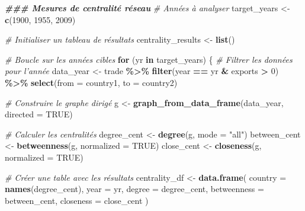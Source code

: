 \documentclass[
]{article}
\newenvironment{Shaded}{\begin{snugshade}}{\end{snugshade}}
\newcommand{\AttributeTok}[1]{\textcolor[rgb]{0.13,0.29,0.53}{#1}}
\newcommand{\CommentTok}[1]{\textcolor[rgb]{0.56,0.35,0.01}{\textit{#1}}}
\newcommand{\ConstantTok}[1]{\textcolor[rgb]{0.56,0.35,0.01}{#1}}
\newcommand{\ControlFlowTok}[1]{\textcolor[rgb]{0.13,0.29,0.53}{\textbf{#1}}}
\newcommand{\DecValTok}[1]{\textcolor[rgb]{0.00,0.00,0.81}{#1}}
\newcommand{\DocumentationTok}[1]{\textcolor[rgb]{0.56,0.35,0.01}{\textbf{\textit{#1}}}}
\newcommand{\FunctionTok}[1]{\textcolor[rgb]{0.13,0.29,0.53}{\textbf{#1}}}
\newcommand{\NormalTok}[1]{#1}
\newcommand{\OtherTok}[1]{\textcolor[rgb]{0.56,0.35,0.01}{#1}}
\newcommand{\SpecialCharTok}[1]{\textcolor[rgb]{0.81,0.36,0.00}{\textbf{#1}}}
\newcommand{\StringTok}[1]{\textcolor[rgb]{0.31,0.60,0.02}{#1}}
\begin{document}
\begin{Shaded}
\begin{Highlighting}[]
\DocumentationTok{\#\#\# Mesures de centralité réseau}
\CommentTok{\# Années à analyser}
\NormalTok{target\_years }\OtherTok{\textless{}{-}} \FunctionTok{c}\NormalTok{(}\DecValTok{1900}\NormalTok{, }\DecValTok{1955}\NormalTok{, }\DecValTok{2009}\NormalTok{)}

\CommentTok{\# Initialiser un tableau de résultats}
\NormalTok{centrality\_results }\OtherTok{\textless{}{-}} \FunctionTok{list}\NormalTok{()}

\CommentTok{\# Boucle sur les années cibles}
\ControlFlowTok{for}\NormalTok{ (yr }\ControlFlowTok{in}\NormalTok{ target\_years) \{}
  \CommentTok{\# Filtrer les données pour l’année}
\NormalTok{  data\_year }\OtherTok{\textless{}{-}}\NormalTok{ trade }\SpecialCharTok{\%\textgreater{}\%}
    \FunctionTok{filter}\NormalTok{(year }\SpecialCharTok{==}\NormalTok{ yr }\SpecialCharTok{\&}\NormalTok{ exports }\SpecialCharTok{\textgreater{}} \DecValTok{0}\NormalTok{) }\SpecialCharTok{\%\textgreater{}\%}
    \FunctionTok{select}\NormalTok{(}\AttributeTok{from =}\NormalTok{ country1, }\AttributeTok{to =}\NormalTok{ country2)}
  
  \CommentTok{\# Construire le graphe dirigé}
\NormalTok{  g }\OtherTok{\textless{}{-}} \FunctionTok{graph\_from\_data\_frame}\NormalTok{(data\_year, }\AttributeTok{directed =} \ConstantTok{TRUE}\NormalTok{)}
  
  \CommentTok{\# Calculer les centralités}
\NormalTok{  degree\_cent }\OtherTok{\textless{}{-}} \FunctionTok{degree}\NormalTok{(g, }\AttributeTok{mode =} \StringTok{"all"}\NormalTok{)}
\NormalTok{  between\_cent }\OtherTok{\textless{}{-}} \FunctionTok{betweenness}\NormalTok{(g, }\AttributeTok{normalized =} \ConstantTok{TRUE}\NormalTok{)}
\NormalTok{  close\_cent }\OtherTok{\textless{}{-}} \FunctionTok{closeness}\NormalTok{(g, }\AttributeTok{normalized =} \ConstantTok{TRUE}\NormalTok{)}
  
  \CommentTok{\# Créer une table avec les résultats}
\NormalTok{  centrality\_df }\OtherTok{\textless{}{-}} \FunctionTok{data.frame}\NormalTok{(}
    \AttributeTok{country =} \FunctionTok{names}\NormalTok{(degree\_cent),}
    \AttributeTok{year =}\NormalTok{ yr,}
    \AttributeTok{degree =}\NormalTok{ degree\_cent,}
    \AttributeTok{betweenness =}\NormalTok{ between\_cent,}
    \AttributeTok{closeness =}\NormalTok{ close\_cent}
\NormalTok{  )}
  

\end{Highlighting}
\end{Shaded}
\end{document}
